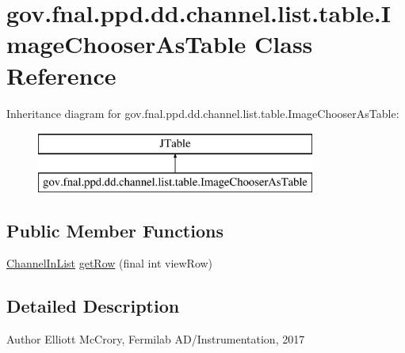 \hypertarget{classgov_1_1fnal_1_1ppd_1_1dd_1_1channel_1_1list_1_1table_1_1ImageChooserAsTable}{\section{gov.\-fnal.\-ppd.\-dd.\-channel.\-list.\-table.\-Image\-Chooser\-As\-Table Class Reference}
\label{classgov_1_1fnal_1_1ppd_1_1dd_1_1channel_1_1list_1_1table_1_1ImageChooserAsTable}
}
Inheritance diagram for gov.\-fnal.\-ppd.\-dd.\-channel.\-list.\-table.\-Image\-Chooser\-As\-Table\-:\begin{figure}[H]
\begin{center}
\leavevmode
\includegraphics[height=2.000000cm]{classgov_1_1fnal_1_1ppd_1_1dd_1_1channel_1_1list_1_1table_1_1ImageChooserAsTable}
\end{center}
\end{figure}
\subsection*{Public Member Functions}
\begin{DoxyCompactItemize}
\item 
\hyperlink{classgov_1_1fnal_1_1ppd_1_1dd_1_1channel_1_1ChannelInList}{Channel\-In\-List} \hyperlink{classgov_1_1fnal_1_1ppd_1_1dd_1_1channel_1_1list_1_1table_1_1ImageChooserAsTable_a9f26ba4f35ca09da14792b4b8b05c94e}{get\-Row} (final int view\-Row)
\end{DoxyCompactItemize}


\subsection{Detailed Description}
\begin{DoxyAuthor}{Author}
Elliott Mc\-Crory, Fermilab A\-D/\-Instrumentation, 2017 
\end{DoxyAuthor}


